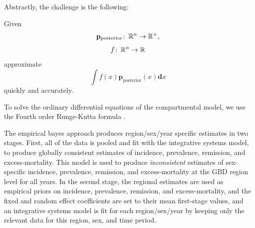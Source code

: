 \documentclass[12pt]{article}
\newcommand{\cc}{\colon\thinspace}
\newcommand{\1}{\mathbf{1}}
\newcommand{\0}{\mathbf{0}}
\newcommand{\bbR}{\mathbb{R}}
\newcommand{\dens}{\mathbf{p}}
\renewcommand{\d}{\mathbf{d}}
\begin{document}
Abstractly, the challenge is the following:


Given
\[
\dens_\text{posterior} \cc \bbR^n\rightarrow \bbR^+,
\]
\[
f \cc \bbR^n \rightarrow \bbR
\]
approximate
\[
\int f(x)\dens_\text{posterior}(x)\d x
\]
quickly and accurately.


To solve the ordinary differential equations of the compartmental
model, we use the Fourth order Runge-Kutta formula \cite{Numerical
  Recipes in Fortran 2nd ed.}.

The empirical bayes approach produces region/sex/year specific
estimates in two stages.  First, all of the data is pooled and fit
with the integrative systems model, to produce globally consistent
estimates of incidence, prevalence, remission, and excess-mortality.
This model is used to produce \emph{inconsistent} estimates of
sex-specific incidence, prevalence, remission, and excess-mortality at
the GBD region level for all years.  In the second stage, the regional
estimates are used as empirical priors on incidence, prevalence,
remission, and excess-mortality, and the fixed and random effect
coefficients are set to their mean first-stage values, and an
integrative systems model is fit for each region/sex/year by keeping
only the relevant data for this region, sex, and time period.



\end{document}
